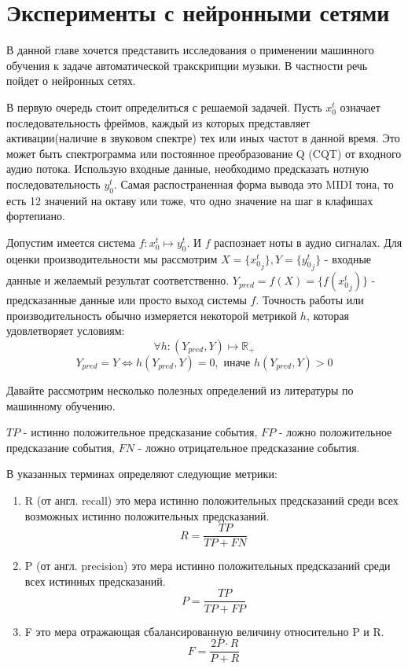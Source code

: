\section{Эксперименты с нейронными сетями}

В данной главе хочется представить исследования о применении машинного обучения
к задаче автоматической тракскрипции музыки. В частности речь пойдет о
нейронных сетях.

В первую очередь стоит определиться с решаемой задачей.
Пусть $x_0^t$ означает последовательность фреймов, каждый из которых
представляет активации(наличие в звуковом спектре)
тех или иных частот в данной время. Это может быть спектрограмма или
постоянное преобразование Q (CQT) от входного аудио потока.
Использую входные данные, необходимо предсказать нотную последовательность
$y_0^t$. Самая распостраненная форма вывода это MIDI тона, то есть
12 значений на октаву или тоже, что одно значение на шаг в клафишах фортепиано.

Допустим имеется система $f: x_0^t \mapsto y_0^t$. И $f$ распознает ноты
в аудио сигналах. Для оценки производительности мы рассмотрим
$X = \{{x_0 ^t}_j\}, Y = \{{y_0^t}_j\}$ - входные данные и желаемый результат
соответственно. $Y_{pred}=f(X)=\{f({x_0^t}_j)\}$ - предсказанные данные
или просто выход системы $f$. Точность работы или производительность
обычно измеряется некоторой метрикой $h$, которая удовлетворяет условиям:
\[
  \forall h: (Y_{pred}, Y) \mapsto \mathbb{R}_{+}
\]
\[
  Y_{pred} = Y \iff h(Y_{pred}, Y) = 0, \text{ иначе } h(Y_{pred}, Y) > 0
\]

Давайте рассмотрим несколько полезных определений из литературы по
машинному обучению.

$TP$ - истинно положительное предсказание события, $FP$ -  ложно положительное
предсказание события, $FN$ - ложно отрицательное предсказание события.

В указанных терминах определяют следующие метрики:
\begin{enumerate}
  \item R (от англ. recall) это мера истинно положительных предсказаний среди всех
    возможных истинно положительных предсказаний.
    \[
      R = \frac{TP}{TP + FN}
    \]
  \item P (от англ. precision) это мера истинно положительных предсказаний
    среди всех истинных предсказаний.
    \[
      P = \frac{TP}{TP + FP}
    \]
  \item F это мера отражающая сбалансированную величину относительно P и R.
    \[
      F = \frac{2 P \cdot R}{P + R}
    \]
\end{enumerate}

